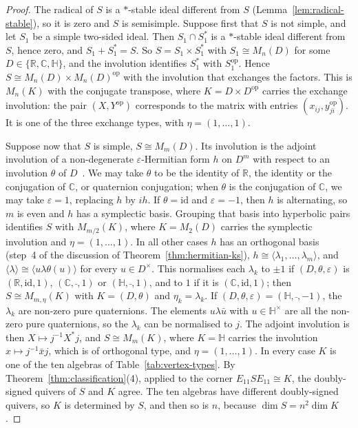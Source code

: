 \documentclass[12pt, a4paper]{report}
\theoremstyle{plain}
\theoremstyle{definition}
\theoremstyle{remark}
\theoremstyle{plain}
\newcommand{\RR}{\mathbb{R}}
\newcommand{\CC}{\mathbb{C}}
\newcommand{\HH}{\mathbb{H}}
\begin{document}
\begin{proof}
The radical of $S$ is a $*$-stable ideal different from $S$ (Lemma~\ref{lem:radical-stable}), so it is zero and $S$ is semisimple. Suppose first that $S$ is not simple, and let $S_1$ be a simple two-sided ideal. Then $S_1\cap S_1^*$ is a $*$-stable ideal different from $S$, hence zero, and $S_1+S_1^*=S$. So $S=S_1\times S_1^*$ with $S_1\cong M_n(D)$ for some $D\in\{\RR,\CC,\HH\}$, and the involution identifies $S_1^*$ with $S_1^{\mathrm{op}}$. Hence $S\cong M_n(D)\times M_n(D)^{\mathrm{op}}$ with the involution that exchanges the factors. This is $M_n(K)$ with the conjugate transpose, where $K=D\times D^{\mathrm{op}}$ carries the exchange involution: the pair $(X,Y^{\mathrm{op}})$ corresponds to the matrix with entries $(x_{ij},y_{ji}^{\mathrm{op}})$. It is one of the three exchange types, with $\eta=(1,\dots,1)$.

Suppose now that $S$ is simple, $S\cong M_m(D)$. Its involution is the adjoint involution of a non-degenerate $\varepsilon$-Hermitian form $h$ on $D^m$ with respect to an involution $\theta$ of $D$~\cite[Ch.~I, \S4]{KMRT1998}. We may take $\theta$ to be the identity of $\RR$, the identity or the conjugation of $\CC$, or quaternion conjugation; when $\theta$ is the conjugation of $\CC$, we may take $\varepsilon=1$, replacing $h$ by $ih$. If $\theta=\mathrm{id}$ and $\varepsilon=-1$, then $h$ is alternating, so $m$ is even and $h$ has a symplectic basis. Grouping that basis into hyperbolic pairs identifies $S$ with $M_{m/2}(K)$, where $K=M_2(D)$ carries the symplectic involution and $\eta=(1,\dots,1)$. In all other cases $h$ has an orthogonal basis (step~4 of the discussion of Theorem~\ref{thm:hermitian-ks}), $h\cong\langle\lambda_1,\dots,\lambda_m\rangle$, and $\langle\lambda\rangle\cong\langle u\lambda\theta(u)\rangle$ for every $u\in D^\times$. This normalises each $\lambda_k$ to $\pm1$ if $(D,\theta,\varepsilon)$ is $(\RR,\mathrm{id},1)$, $(\CC,\bar{\ },1)$ or $(\HH,\bar{\ },1)$, and to $1$ if it is $(\CC,\mathrm{id},1)$; then $S\cong M_{m,\eta}(K)$ with $K=(D,\theta)$ and $\eta_k=\lambda_k$. If $(D,\theta,\varepsilon)=(\HH,\bar{\ },-1)$, the $\lambda_k$ are non-zero pure quaternions. The elements $u\lambda\bar u$ with $u\in\HH^\times$ are all the non-zero pure quaternions, so the $\lambda_k$ can be normalised to $j$. The adjoint involution is then $X\mapsto j^{-1}X^*j$, and $S\cong M_m(K)$, where $K=\HH$ carries the involution $x\mapsto j^{-1}\bar xj$, which is of orthogonal type, and $\eta=(1,\dots,1)$. In every case $K$ is one of the ten algebras of Table~\ref{tab:vertex-types}. By Theorem~\ref{thm:classification}(4), applied to the corner $E_{11}SE_{11}\cong K$, the doubly-signed quivers of $S$ and $K$ agree. The ten algebras have different doubly-signed quivers, so $K$ is determined by $S$, and then so is $n$, because $\dim S=n^2\dim K$.


\end{proof}
\end{document}
